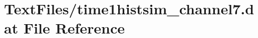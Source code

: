 \hypertarget{TextFiles_2time1histsim__channel7_8dat}{}\section{Text\+Files/time1histsim\+\_\+channel7.dat File Reference}
\label{TextFiles_2time1histsim__channel7_8dat}
